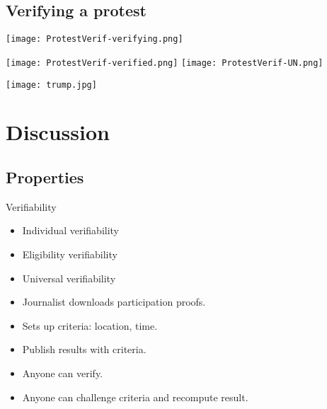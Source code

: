 \subsection[Verifying]{Verifying a protest}

\begin{frame}
  \centering
  \texttt{[image: ProtestVerif-verifying.png]}
\end{frame}

\begin{frame}
  \centering
  \texttt{[image: ProtestVerif-verified.png]}
  \texttt{[image: ProtestVerif-UN.png]}
\end{frame}

\begin{frame}
  \centering
  \texttt{[image: trump.jpg]}
\end{frame}


\section{Discussion}

\subsection{Properties}

\begin{frame}
  \begin{block}{Verifiability}
    \begin{itemize}
      \item Individual verifiability
      \item Eligibility verifiability
      \item Universal verifiability
    \end{itemize}
  \end{block}

  \begin{example}
    \begin{itemize}
      \item Journalist downloads participation proofs.
      \item Sets up criteria: location, time.
      \item Publish results with criteria.
      \item Anyone can verify.
      \item Anyone can challenge criteria and recompute result.
    \end{itemize}
  \end{example}
\end{frame}

